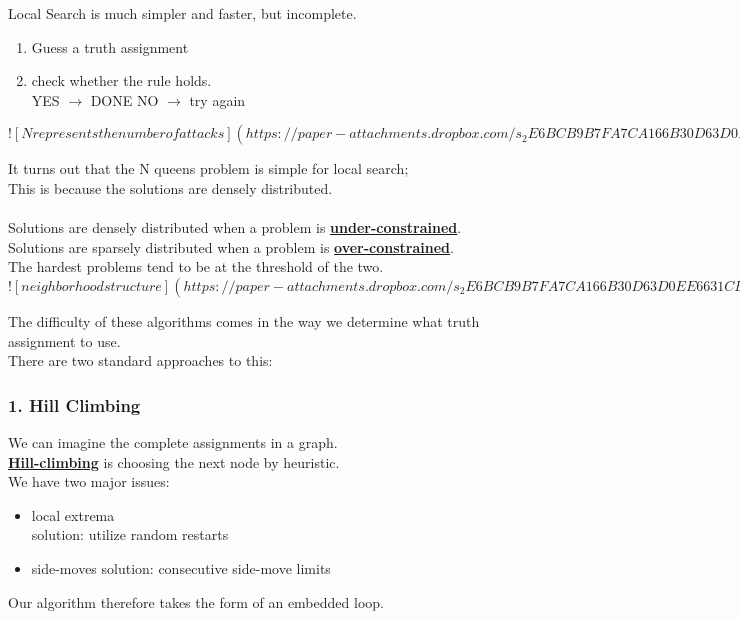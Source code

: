 \documentclass[../../lecture_notes.tex]{subfiles}
\begin{document}
\noindent Local Search is much simpler and faster, but incomplete.
\begin{enumerate} [itemsep=0mm]
	\item Guess a truth assignment
	\item check whether the rule holds.\\
		YES $\rightarrow$ DONE
		NO $\rightarrow$ try again
\end{enumerate}

\newpage
$![N represents the number of attacks](https://paper-attachments.dropbox.com/s_2E6BCB9B7FA7CA166B30D63D0EE6631CB92348B5FD5B0AE0D0B6403B17C7DD96_1588410528611_Untitled+drawing+17.jpg)$
\newpage

\noindent It turns out that the N queens problem is simple for local search;\\
\indent This is because the solutions are densely distributed.\\
\\
Solutions are densely distributed when a problem is \textbf{\underline{under-constrained}}.\\
Solutions are sparsely distributed when a problem is \textbf{\underline{over-constrained}}.\\
The hardest problems tend to be at the threshold of the two.\\

\newpage
$![neighborhood structure](https://paper-attachments.dropbox.com/s_2E6BCB9B7FA7CA166B30D63D0EE6631CB92348B5FD5B0AE0D0B6403B17C7DD96_1588410892286_Untitled+drawing+18.jpg)$
\newpage

\noindent The difficulty of these algorithms comes in the way we determine what truth assignment to use.\\
There are two standard approaches to this:

\subsubsection*{1. Hill Climbing}
We can imagine the complete assignments in a graph.\\
\textbf{\underline{Hill-climbing}} is choosing the next node by heuristic.\\
We have two major issues:
	\begin{itemize} [itemsep=0mm]
		\item local extrema\\
			solution: utilize random restarts
		\item side-moves
			solution: consecutive side-move limits
	\end{itemize}
Our algorithm therefore takes the form of an embedded loop.\\
\end{document}
